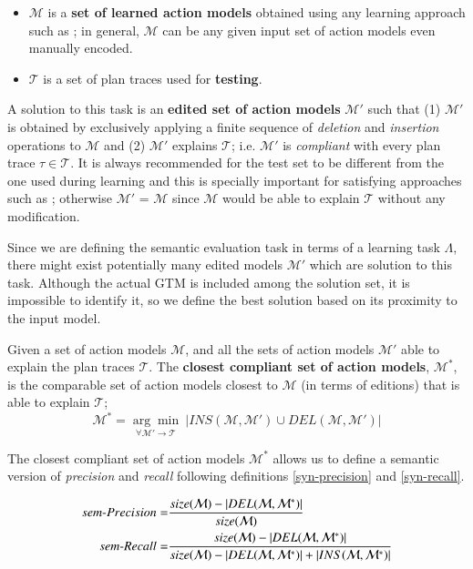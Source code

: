 \begin{itemize}
	\item $\mathcal{M}$ is a \textbf{set of learned action models} obtained using any learning approach such as \FAMA; in general, $\mathcal{M}$ can be any given input set of action models even manually encoded.
	\item$\mathcal{T}$ is a set of plan traces  used for \textbf{testing}.
\end{itemize}


A solution to this task is an \textbf{edited set of action models} $\mathcal{M'}$ such that (1) $\mathcal{M'}$ is obtained by exclusively applying a finite sequence of \emph{deletion} and \emph{insertion} operations to $\mathcal{M}$ and (2) $\mathcal{M'}$ explains $\mathcal{T}$; i.e. $\mathcal{M'}$ is {\em compliant} with every plan trace $\tau\in\mathcal{T}$. It is always recommended for the test set to be different from the one used during learning and this is specially important for satisfying approaches such as \FAMA; otherwise $\mathcal{M'}$ = $\mathcal{M}$ since $\mathcal{M}$ would be able to explain $\mathcal{T}$ without any modification.

Since we are defining the semantic evaluation task in terms of a learning task $\Lambda$, there might exist potentially many edited models $\mathcal{M'}$ which are solution to this task. Although the actual GTM is included among the solution set, it is impossible to identify it, so we define the best solution based on its proximity to the input model.

\begin{mydefinition}
  Given a set of action models $\mathcal{M}$, and all the sets of action models $\mathcal{M'}$ able to explain the plan traces $\mathcal{T}$. The {\bf closest compliant set of action models}, $\mathcal{M^*}$, is the comparable set of action models closest to $\mathcal{M}$ (in terms of editions) that is able to explain $\mathcal{T}$;
  \[\mathcal{M^*}=\underset{\forall \mathcal{M}' \rightarrow \mathcal{T}}{\arg\min} \ \left| INS(\mathcal{M},\mathcal{M'}) \cup DEL(\mathcal{M},\mathcal{M'}) \right|\]
\end{mydefinition}


The closest compliant set of action models $\mathcal{M^*}$ allows us to define a semantic version of {\em precision} and {\em recall} following definitions \ref{syn-precision} and \ref{syn-recall}.


\begin{small}
	\begin{align*}
	sem\text{-}Precision=&\frac{size(\mathcal{M})- \left|DEL(\mathcal{M},\mathcal{M^*})\right|}{size(\mathcal{M})}\\
    \vspace{0.5cm}
	sem\text{-}Recall=&\frac{size(\mathcal{M})- \left|DEL(\mathcal{M},\mathcal{M^*})\right|}{size(\mathcal{M}) - \left|DEL(\mathcal{M},\mathcal{M^*})\right| + \left|INS(\mathcal{M},\mathcal{M^*})\right|}
	\end{align*}
\end{small}




